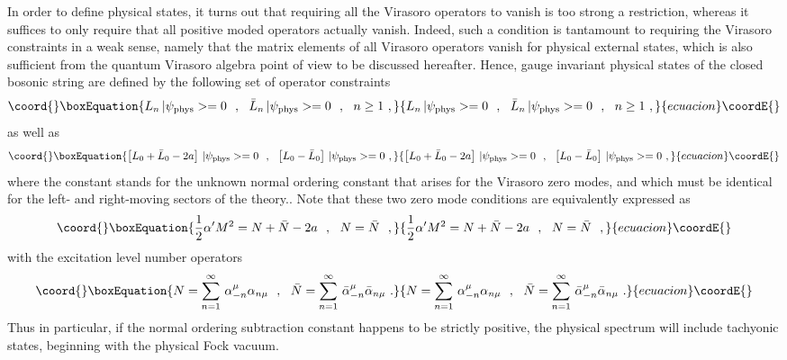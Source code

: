 \documentclass[a4paper,11pt]{article}
\begin{document}
In order to define physical states, it turns out that requiring all the
Virasoro operators to vanish is too strong a restriction, whereas it
suffices to only require that all positive moded operators actually vanish.
Indeed, such a condition is tantamount to requiring the Virasoro constraints
in a weak sense, namely that the matrix elements of all Virasoro operators
vanish for physical external states, which is also sufficient from the quantum
Virasoro algebra point of view to be discussed hereafter. Hence, gauge
invariant physical states of the closed bosonic string are defined by the
following set of operator constraints
\begin{equation}\coord{}\boxEquation{
L_n\,|\psi_{\rm phys}>=0\ \ ,\ \ 
\bar{L}_n\,|\psi_{\rm phys}>=0\ \ ,\ \ n\ge 1\ ,
}{
L_n\,|\psi_{\rm phys}>=0\ \ ,\ \ 
\bar{L}_n\,|\psi_{\rm phys}>=0\ \ ,\ \ n\ge 1\ ,
}{ecuacion}\coordE{}\end{equation}
as well as
\begin{equation}\coord{}\boxEquation{
\left[L_0+\bar{L}_0-2a\right]\,|\psi_{\rm phys}>=0\ \ ,\ \ 
\left[L_0-\bar{L}_0\right]\,|\psi_{\rm phys}>=0\ ,
}{
\left[L_0+\bar{L}_0-2a\right]\,|\psi_{\rm phys}>=0\ \ ,\ \ 
\left[L_0-\bar{L}_0\right]\,|\psi_{\rm phys}>=0\ ,
}{ecuacion}\coordE{}\end{equation}
where the constant \coordHE{} stands for the unknown normal ordering constant
that arises for the Virasoro zero modes, and which must be identical for
the left- and right-moving sectors of the theory.. Note that these two
zero mode conditions are equivalently expressed as
\begin{equation}\coord{}\boxEquation{
\frac{1}{2}\alpha' M^2=N+\bar{N}-2a\ \ ,\ \ N=\bar{N}\ \ ,
}{
\frac{1}{2}\alpha' M^2=N+\bar{N}-2a\ \ ,\ \ N=\bar{N}\ \ ,
}{ecuacion}\coordE{}\end{equation}
with the excitation level number operators
\begin{equation}\coord{}\boxEquation{
N=\sum_{n=1}^\infty\,\alpha^\mu_{-n}\alpha_{n\mu}\ \ ,\ \ 
\bar{N}=\sum_{n=1}^\infty\,\bar{\alpha}^\mu_{-n}\bar{\alpha}_{n\mu}\ .
}{
N=\sum_{n=1}^\infty\,\alpha^\mu_{-n}\alpha_{n\mu}\ \ ,\ \ 
\bar{N}=\sum_{n=1}^\infty\,\bar{\alpha}^\mu_{-n}\bar{\alpha}_{n\mu}\ .
}{ecuacion}\coordE{}\end{equation}
Thus in particular, if the normal ordering subtraction constant \coordHE{}
happens to be strictly positive, the physical spectrum will include tachyonic
states, beginning with the physical Fock vacuum. 
\end{document}
